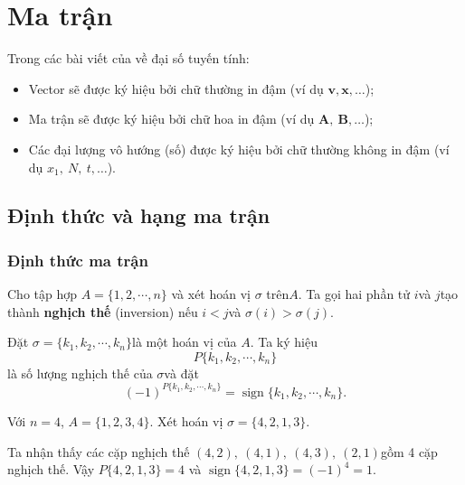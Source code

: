 \documentclass{mynotes}
\DeclareMathOperator{\sign}{sign}
\begin{document}
\tableofcontents

\chapter{Ma trận}

Trong các bài viết của về đại số tuyến tính:

\begin{itemize}
    \item Vector sẽ được ký hiệu bởi chữ thường in đậm (ví dụ $\bm{v}, \bm{x}, \ldots$)​; 
    \item Ma trận sẽ được ký hiệu bởi chữ hoa in đậm (ví dụ $\bm{A},\ \bm{B}, \ldots$​);
    \item Các đại lượng vô hướng (số) được ký hiệu bởi chữ thường không in đậm (ví dụ $x_1,\ N,\ t, \ldots$).
\end{itemize}

\section{Định thức và hạng ma trận}

\subsection*{Định thức ma trận}

\begin{definition}
    Cho tập hợp $A = \{1, 2, \cdots, n\}$ và xét hoán vị $\sigma$ trên ​$A$. Ta gọi hai phần tử $i$​ và $j$​ tạo thành \textbf{nghịch thế} (inversion) nếu $i < j$​ và $\sigma(i) > \sigma(j)$.

    Đặt $\sigma = \{k_1, k_2, \cdots, k_n\}$​ là một hoán vị của $A$​. Ta ký hiệu \[ P\{k_1, k_2, \cdots, k_n\} \] là số lượng nghịch thế của $\sigma$​ và đặt \[ (-1)^{P\{k_1, k_2, \cdots, k_n\}} = \sign \{k_1, k_2, \cdots, k_n\}. \]
\end{definition}

\begin{example}
    Với $n=4$​, $A = \{1, 2, 3, 4\}$​. Xét hoán vị $\sigma = \{4, 2, 1, 3\}$.

    Ta nhận thấy các cặp nghịch thế $(4, 2),\ (4, 1),\ (4, 3),\ (2, 1)$​ gồm 4 cặp nghịch thế. Vậy $P\{4, 2, 1, 3\} = 4$ và $\sign \{4, 2, 1, 3\}=(-1)^4=1$​.
\end{example}
\end{document}

